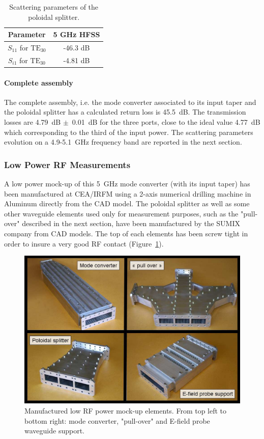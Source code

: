 \begin{table}[h]
	\centering{}%
	\begin{tabular}{|c|c|}
		\hline 
		Parameter & 5 GHz HFSS\tabularnewline
		\hline 
		\hline 
		$S_{11}$ for $\mbox{TE}_{30}$ & -46.3 dB\tabularnewline
		\hline 
		$S_{i1}$ for $\mbox{TE}_{30}$ & -4.81 dB\tabularnewline
		\hline 
	\end{tabular}
	\caption{Scattering parameters of the poloidal splitter.}
	\label{tab:PoloidalSplitter_Sparameters}
\end{table}

\paragraph{Complete assembly}
The complete assembly, i.e. the mode converter associated to its input taper and the poloidal splitter has  a calculated return loss is 45.5~dB. The transmission losses are 4.79~dB $\pm$~0.01~dB for the three ports, close to the ideal value 4.77~dB which corresponding to the third of the input power. The scattering parameters evolution on a 4.9-5.1~GHz frequency band are reported in the next section.

\subsubsection{Low Power RF Measurements}
A low power mock-up of this 5~GHz mode converter (with its input taper) has been manufactured at CEA/IRFM using a 2-axis numerical drilling machine in Aluminum directly from the CAD model. The poloidal splitter as well as some other waveguide elements used only for measurement purposes, such as the "pull-over" described in the next section, have been manufactured by the SUMIX company from CAD models. The top of each elements has been screw tight in order to insure a very good RF contact (Figure~\ref{fig:ModeConverterMockUpElements}). 

\begin{figure}[h]
	\includegraphics[width=1.0\textwidth]{figures/chap3/ITER_modeconverter/LH4ITER_ModeConverterMockUpElements}
	\caption{Manufactured low RF power mock-up elements. From top left to bottom right: mode converter,  "pull-over" and E-field probe waveguide support. }
	\label{fig:ModeConverterMockUpElements}
\end{figure}

